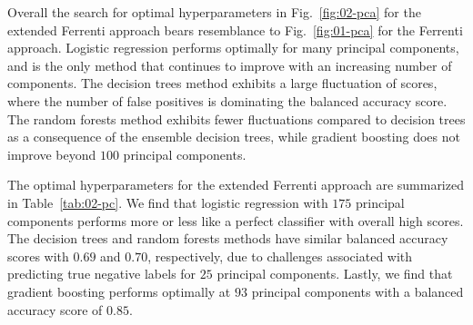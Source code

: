 \documentclass[superscriptaddress,unsortedaddress,
 amsmath,amssymb,
 aps,
]{revtex4-2}
\begin{document}
Overall the search for optimal hyperparameters in Fig.~\ref{fig:02-pca} for the extended Ferrenti approach bears resemblance to Fig.~\ref{fig:01-pca} for the Ferrenti approach. Logistic regression performs optimally for many principal components, and is the only method that continues to improve with an increasing number of components. The decision trees method exhibits a large fluctuation of scores, where the number of false positives is dominating the balanced accuracy score. The random forests method exhibits fewer fluctuations compared to decision trees as a consequence of the ensemble decision trees, while gradient boosting does not improve beyond $100$ principal components.

\begin{table}[t]
\centering
\caption{Optimal number of principal components and the respective scores (standard deviation) for each of the four ML methods logistic regression (LOG), decision trees (DT), random forests (RF) and gradient boosting (GB) in the extended Ferrenti approach, as visualized by the dash-dotted line in Fig.~\ref{fig:02-pca}.}
\label{tab:02-pc}
\noindent{}
\end{table}

The optimal hyperparameters for the extended Ferrenti approach are summarized in Table~\ref{tab:02-pc}. We find that logistic regression with $175$ principal components performs more or less like a perfect classifier with overall high scores. The decision trees and random forests methods have similar balanced accuracy scores with $0.69$ and $0.70$, respectively, due to challenges associated with predicting true negative labels for $25$ principal components. Lastly, we find that gradient boosting performs optimally at $93$ principal components with a balanced accuracy score of $0.85$. 
\end{document}
